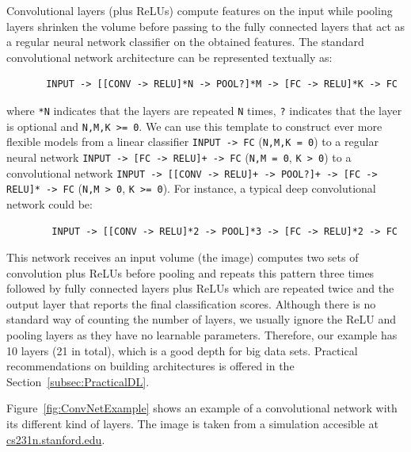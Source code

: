 \bigskip
Convolutional layers (plus ReLUs) compute features on the input while pooling layers shrinken the volume before passing to the fully connected layers that act as a regular neural network classifier on the obtained features. The standard convolutional network architecture can be represented textually as:
\begin{verbatim}
       INPUT -> [[CONV -> RELU]*N -> POOL?]*M -> [FC -> RELU]*K -> FC
\end{verbatim}
where \texttt{*N} indicates that the layers are repeated \texttt{N} times, \texttt{?} indicates that the layer is optional and \texttt{N,M,K >= 0}. We can use this template to construct ever more flexible models from a linear classifier \texttt{INPUT -> FC} (\texttt{N,M,K = 0}) to a regular neural network \texttt{INPUT -> [FC -> RELU]+ -> FC} (\texttt{N,M = 0}, \texttt{K > 0}) to a convolutional network \texttt{INPUT -> [[CONV -> RELU]+ -> POOL?]+ -> [FC -> RELU]* -> FC} (\texttt{N,M > 0}, \texttt{K >= 0}). For instance, a typical deep convolutional network could be:
\begin{verbatim}
        INPUT -> [[CONV -> RELU]*2 -> POOL]*3 -> [FC -> RELU]*2 -> FC
\end{verbatim}
This network receives an input volume (the image) computes two sets of convolution plus ReLUs before pooling and repeats this pattern three times followed by fully connected layers plus ReLUs which are repeated twice and the output layer that reports the final classification scores. Although there is no standard way of counting the number of layers, we usually ignore the ReLU and pooling layers as they have no learnable parameters. Therefore, our example has 10 layers (21 in total), which is a good depth for big data sets. Practical recommendations on building architectures is offered in the Section~\ref{subsec:PracticalDL}.

Figure~\ref{fig:ConvNetExample} shows an example of a convolutional network with its different kind of layers. The image is taken from a simulation accesible at \url{cs231n.stanford.edu}.

